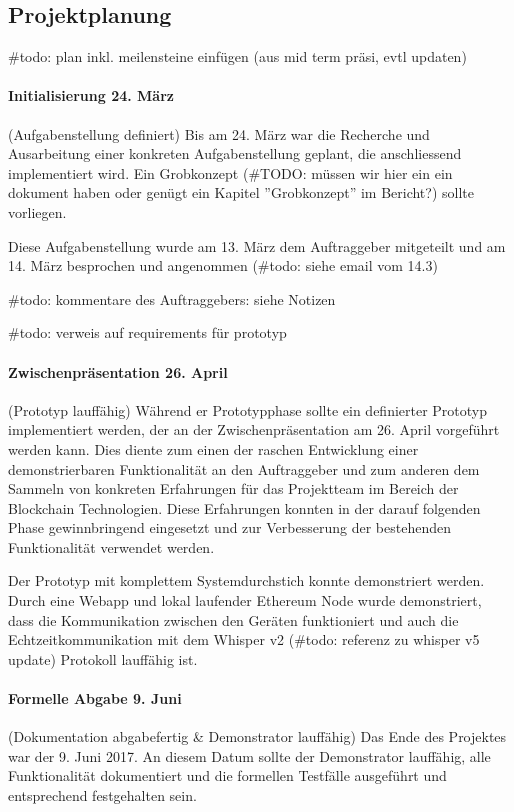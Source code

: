 \subsection{Projektplanung}
\#todo: plan inkl. meilensteine einfügen (aus mid term präsi, evtl updaten)

\paragraph{Initialisierung 24. März}
(Aufgabenstellung definiert) Bis am 24. März war die Recherche und Ausarbeitung einer konkreten Aufgabenstellung geplant, die anschliessend implementiert wird. Ein Grobkonzept (\#TODO: müssen wir hier ein ein dokument haben oder genügt ein Kapitel ''Grobkonzept'' im Bericht?) sollte vorliegen.

Diese Aufgabenstellung wurde am 13. März dem Auftraggeber mitgeteilt und am 14. März besprochen und angenommen (\#todo: siehe email vom 14.3)

\#todo: kommentare des Auftraggebers: siehe Notizen

\#todo: verweis auf requirements für prototyp

\paragraph{Zwischenpräsentation 26. April}
(Prototyp lauffähig) Während er Prototypphase sollte ein definierter Prototyp implementiert werden, der an der Zwischenpräsentation am 26. April vorgeführt werden kann. Dies diente zum einen der raschen Entwicklung einer demonstrierbaren Funktionalität an den Auftraggeber und zum anderen dem Sammeln von konkreten Erfahrungen für das Projektteam im Bereich der Blockchain Technologien. Diese Erfahrungen konnten in der darauf folgenden Phase gewinnbringend eingesetzt und zur Verbesserung der bestehenden Funktionalität verwendet werden.

Der Prototyp mit komplettem Systemdurchstich konnte demonstriert werden. Durch eine Webapp und lokal laufender Ethereum Node wurde demonstriert, dass die Kommunikation zwischen den Geräten funktioniert und auch die Echtzeitkommunikation mit dem Whisper v2 (\#todo: referenz zu whisper v5 update) Protokoll lauffähig ist.

\paragraph{Formelle Abgabe 9. Juni}
(Dokumentation abgabefertig \& Demonstrator lauffähig) Das Ende des Projektes war der 9. Juni 2017. An diesem Datum sollte der Demonstrator lauffähig, alle Funktionalität dokumentiert und die formellen Testfälle ausgeführt und entsprechend festgehalten sein. 


